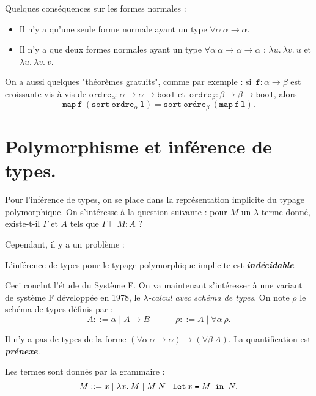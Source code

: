\documentclass[./main]{subfiles}
\begin{document}
  Quelques conséquences sur les formes normales :
  \begin{itemize}
    \item Il n'y a qu'une seule forme normale ayant un type $\forall \alpha \: \alpha \to \alpha$.
    \item Il n'y a que deux formes normales ayant un type $\forall \alpha \: \alpha \to \alpha \to \alpha$ : $\lambda u.\: \lambda v.\: u$ et $\lambda u.\: \lambda v.\: v$.
  \end{itemize}
  On a aussi quelques "théorèmes gratuits", comme par exemple : si~$\mathtt{f} : \alpha \to \beta$ est croissante vis à vis de $\mathtt{ordre}_\alpha : \alpha \to \alpha \to \mathtt{bool}$ et~$\mathtt{ordre}_\beta : \beta \to \beta \to \mathtt{bool}$, alors 
  \[
  \mathtt{map} \ \mathtt{f} \ (\mathtt{sort}\ \mathtt{ordre}_\alpha\ \mathtt{l}) = \mathtt{sort} \ \mathtt{ordre}_\beta \ (\mathtt{map}\ \mathtt{f}\ \mathtt{l})
  .\] 


  \section{Polymorphisme et inférence de types.}

  Pour l'inférence de types, on se place dans la représentation implicite du typage polymorphique.
  On s'intéresse à la question suivante : pour $M$ un $\lambda$-terme donné, existe-t-il $\Gamma$ et $A$ tels que $\Gamma \vdash M : A$ ?

  Cependant, il y a un problème :
  \begin{thm}[\~1992]
    L'inférence de types pour le typage polymorphique implicite est \textit{\textbf{indécidable}}.
  \end{thm}

  Ceci conclut l'étude du Système F. On va maintenant s'intéresser à une variant de système F développée en 1978, le \textit{$\lambda$-calcul avec schéma de types}.
  On note $\rho$ le schéma de types définis par :
  \[
  A ::= \alpha  \mid A \to B \quad\quad\quad \rho ::= A  \mid \forall \alpha \: \rho
  .\]

  \begin{rmk}
    Il n'y a pas de types de la forme $(\forall \alpha \: \alpha \to \alpha) \to (\forall \beta \: A)$.
    La quantification est \textit{\textbf{prénexe}}.
  \end{rmk}

  Les termes sont donnés par la grammaire :
  \[
  M ::= x  \mid \lambda x. \: M  \mid M \: N  \mid \letin x M N
  .\]
\end{document}
